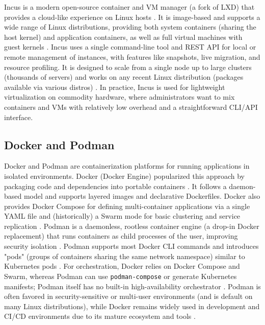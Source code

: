 Incus is a modern open-source container and VM manager (a fork of LXD) that provides a cloud-like experience on Linux hosts \cite{IncusLinuxContainers2023}. It is image-based and supports a wide range of Linux distributions, providing both system containers (sharing the host kernel) and application containers, as well as full virtual machines with guest kernels \cite{IncusLinuxContainers2023}. Incus uses a single command-line tool and REST API for local or remote management of instances, with features like snapshots, live migration, and resource profiling. It is designed to scale from a single node up to large clusters (thousands of servers) \cite{IncusLinuxContainers2023} and works on any recent Linux distribution (packages available via various distros) \cite{IncusLinuxContainers2023}. In practice, Incus is used for lightweight virtualization on commodity hardware, where administrators want to mix containers and VMs with relatively low overhead and a straightforward CLI/API interface.

\subsection{Docker and Podman}

Docker and Podman are containerization platforms for running applications in isolated environments. Docker (Docker Engine) popularized this approach by packaging code and dependencies into portable containers \cite{SpaceliftPodmanDocker2024}. It follows a daemon-based model and supports layered images and declarative Dockerfiles. Docker also provides Docker Compose for defining multi-container applications via a single YAML file and (historically) a Swarm mode for basic clustering and service replication \cite{SpaceliftPodmanDocker2024}. Podman is a daemonless, rootless container engine (a drop-in Docker replacement) that runs containers as child processes of the user, improving security isolation \cite{SpaceliftPodmanDocker2024}. Podman supports most Docker CLI commands and introduces "pods" (groups of containers sharing the same network namespace) similar to Kubernetes pods \cite{SpaceliftPodmanDocker2024}. For orchestration, Docker relies on Docker Compose and Swarm, whereas Podman can use \texttt{podman-compose} or generate Kubernetes manifests; Podman itself has no built-in high-availability orchestrator \cite{SpaceliftPodmanDocker2024}. Podman is often favored in security-sensitive or multi-user environments (and is default on many Linux distributions), while Docker remains widely used in development and CI/CD environments due to its mature ecosystem and tools \cite{SpaceliftPodmanDocker2024}.

